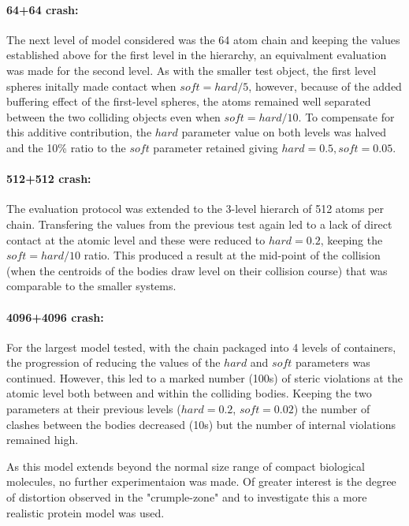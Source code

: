 \paragraph{64+64 crash:\\}

The next level of model considered was the 64 atom chain and keeping the values established
above for the first level in the hierarchy, an equivalment evaluation was made for the second level.
As with the smaller test object, the first level spheres initally made contact when $soft = hard/5$,
however, because of the added buffering effect of the first-level spheres, the atoms remained
well separated between the two colliding objects even when $soft = hard/10$.  To compensate for
this additive contribution, the $hard$ parameter value on both levels was halved and the 10\%
ratio to the $soft$ parameter retained giving $hard = 0.5, soft = 0.05$. 

\paragraph{512+512 crash:\\}

The evaluation protocol was extended to the 3-level hierarch of 512 atoms per chain.
Transfering the values from the previous test again led to a lack of direct contact at the
atomic level and these were reduced to $hard = 0.2$, keeping the $soft = hard/10$ ratio.
This produced a result at the mid-point of the collision (when the centroids of the bodies
draw level on their collision course) that was comparable to the smaller systems.

\paragraph{4096+4096 crash:\\}

For the largest model tested, with the chain packaged into 4 levels of containers,  the
progression of reducing the values of the $hard$ and $soft$ parameters was continued.
However, this led to a marked number (100s) of steric violations at the atomic level both
between and within the colliding bodies.   Keeping the two parameters at their previous
levels ($hard = 0.2$, $soft = 0.02$) the number of clashes between the bodies decreased
(10s) but the number of internal violations remained high.

As this model extends beyond the normal size range of compact biological molecules,
no further experimentaion was made.   Of greater interest is the degree of distortion 
observed in the "crumple-zone" and to investigate this a more realistic protein model
was used.


